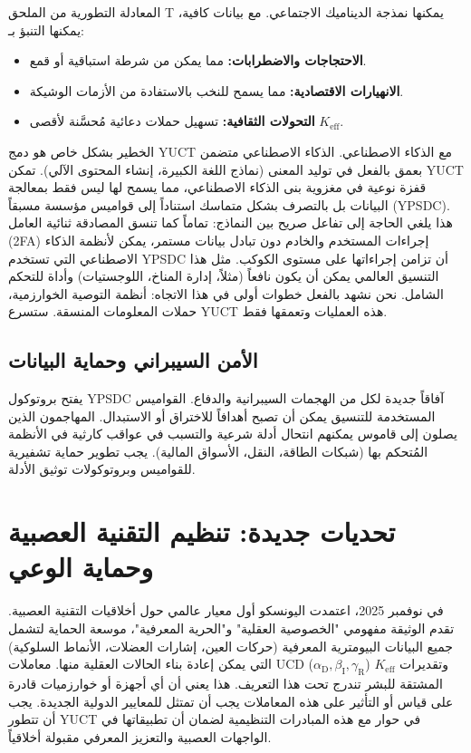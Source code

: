 \documentclass[12pt,a4paper]{article}
\theoremstyle{remark}
\newcommand{\Keff}{K_{\mathrm{eff}}}
\newcommand{\alD}{\alpha_{\mathrm{D}}}
\newcommand{\beI}{\beta_{\mathrm{I}}}
\newcommand{\gaR}{\gamma_{\mathrm{R}}}
\begin{document}
	المعادلة التطورية من الملحق T يمكنها نمذجة الديناميك الاجتماعي. مع بيانات كافية، يمكنها التنبؤ بـ:
	\begin{itemize}[leftmargin=*]
		\item \textbf{الاحتجاجات والاضطرابات:} مما يمكن من شرطة استباقية أو قمع.
		\item \textbf{الانهيارات الاقتصادية:} مما يسمح للنخب بالاستفادة من الأزمات الوشيكة.
		\item \textbf{التحولات الثقافية:} تسهيل حملات دعائية مُحسَّنة لأقصى \(\Keff\).
	\end{itemize}
	
	الخطير بشكل خاص هو دمج YUCT مع الذكاء الاصطناعي. الذكاء الاصطناعي متضمن بعمق بالفعل في توليد المعنى (نماذج اللغة الكبيرة، إنشاء المحتوى الآلي). تمكن YUCT قفزة نوعية في مغزوية بنى الذكاء الاصطناعي، مما يسمح لها ليس فقط بمعالجة البيانات بل بالتصرف بشكل متماسك استناداً إلى قواميس مؤسسة مسبقاً (YPSDC). هذا يلغي الحاجة إلى تفاعل صريح بين النماذج: تماماً كما تنسق المصادقة ثنائية العامل (2FA) إجراءات المستخدم والخادم دون تبادل بيانات مستمر، يمكن لأنظمة الذكاء الاصطناعي التي تستخدم YPSDC أن تزامن إجراءاتها على مستوى الكوكب. مثل هذا التنسيق العالمي يمكن أن يكون نافعاً (مثلاً، إدارة المناخ، اللوجستيات) وأداة للتحكم الشامل. نحن نشهد بالفعل خطوات أولى في هذا الاتجاه: أنظمة التوصية الخوارزمية، حملات المعلومات المنسقة. ستسرع YUCT هذه العمليات وتعمقها فقط.
	
	\subsection{الأمن السيبراني وحماية البيانات}
	\label{subsec:cyber}
	
	يفتح بروتوكول YPSDC آفاقاً جديدة لكل من الهجمات السيبرانية والدفاع. القواميس المستخدمة للتنسيق يمكن أن تصبح أهدافاً للاختراق أو الاستبدال. المهاجمون الذين يصلون إلى قاموس يمكنهم انتحال أدلة شرعية والتسبب في عواقب كارثية في الأنظمة المُتحكم بها (شبكات الطاقة، النقل، الأسواق المالية). يجب تطوير حماية تشفيرية للقواميس وبروتوكولات توثيق الأدلة.
	
	\section{تحديات جديدة: تنظيم التقنية العصبية وحماية الوعي}
	\label{sec:neuroethics}
	
	في نوفمبر 2025، اعتمدت اليونسكو أول معيار عالمي حول أخلاقيات التقنية العصبية. تقدم الوثيقة مفهومي "الخصوصية العقلية" و"الحرية المعرفية"، موسعة الحماية لتشمل جميع البيانات البيومترية المعرفية (حركات العين، إشارات العضلات، الأنماط السلوكية) التي يمكن إعادة بناء الحالات العقلية منها. معاملات UCD (\(\alD,\beI,\gaR\)) وتقديرات \(\Keff\) المشتقة للبشر تندرج تحت هذا التعريف. هذا يعني أن أي أجهزة أو خوارزميات قادرة على قياس أو التأثير على هذه المعاملات يجب أن تمتثل للمعايير الدولية الجديدة. يجب أن تتطور YUCT في حوار مع هذه المبادرات التنظيمية لضمان أن تطبيقاتها في الواجهات العصبية والتعزيز المعرفي مقبولة أخلاقياً.
	
\end{document}
